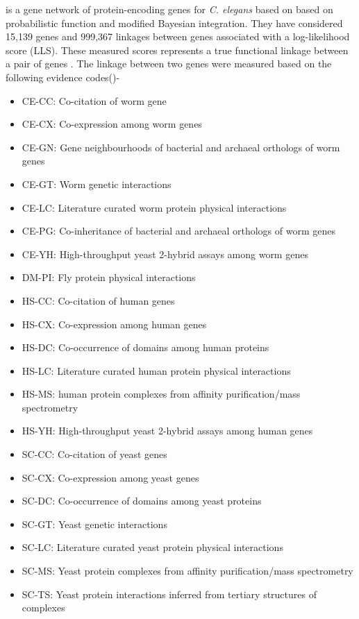 \cite{WormNet} is a gene network of protein-encoding genes for \textit{C. elegans} based on based on probabilistic function and modified Bayesian integration. They have considered 15,139 genes and 999,367 linkages between genes associated with a log-likelihood score (LLS). These measured scores represents a true functional linkage between a pair of genes \cite{Lee:2007}. The linkage between two genes were measured based on the following evidence codes(\cite{WormNet})-
\begin{itemize}
 \item CE-CC: 	Co-citation of worm gene
 \item CE-CX: 	Co-expression among worm genes
 \item CE-GN: 	Gene neighbourhoods of bacterial and archaeal orthologs of worm genes
 \item CE-GT: 	Worm genetic interactions
 \item CE-LC: 	Literature curated worm protein physical interactions
 \item CE-PG: 	Co-inheritance of bacterial and archaeal orthologs of worm genes
 \item CE-YH: 	High-throughput yeast 2-hybrid assays among worm genes
 \item DM-PI: 	Fly protein physical interactions
 \item HS-CC: 	Co-citation of human genes
 \item HS-CX: 	Co-expression among human genes
 \item HS-DC: 	Co-occurrence of domains among human proteins
 \item HS-LC: 	Literature curated human protein physical interactions
 \item HS-MS: 	human protein complexes from affinity purification/mass spectrometry
 \item HS-YH: 	High-throughput yeast 2-hybrid assays among human genes
 \item SC-CC: 	Co-citation of yeast genes
 \item SC-CX: 	Co-expression among yeast genes
 \item SC-DC: 	Co-occurrence of domains among yeast proteins
 \item SC-GT: 	Yeast genetic interactions
 \item SC-LC: 	Literature curated yeast protein physical interactions
 \item SC-MS: 	Yeast protein complexes from affinity purification/mass spectrometry
 \item SC-TS: 	Yeast protein interactions inferred from tertiary structures of complexes
\end{itemize}

